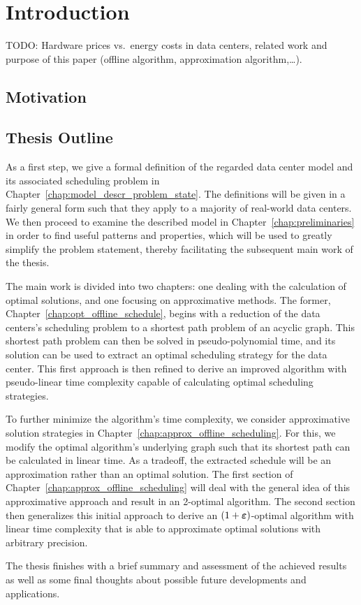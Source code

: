 
\chapter{Introduction}
TODO: Hardware prices vs.\ energy costs in data centers, related work and purpose of this paper (offline algorithm, approximation algorithm,\ldots).
\section{Motivation}

\section{Thesis Outline}
As a first step, we give a formal definition of the regarded data center model and its associated scheduling problem in Chapter~\ref{chap:model_descr_problem_state}. The definitions will be given in a fairly general form such that they apply to a majority of real-world data centers. We then proceed to examine the described model in Chapter~\ref{chap:preliminaries} in order to find useful patterns and properties, which will be used to greatly simplify the problem statement, thereby facilitating the subsequent main work of the thesis.

The main work is divided into two chapters: one dealing with the calculation of optimal solutions, and one focusing on approximative methods. The former, Chapter~\ref{chap:opt_offline_schedule}, begins with a reduction of the data centers's scheduling problem to a shortest path problem of an acyclic graph. This shortest path problem can then be solved in pseudo-polynomial time, and its solution can be used to extract an optimal scheduling strategy for the data center. This first approach is then refined to derive an improved algorithm with pseudo-linear time complexity capable of calculating optimal scheduling strategies. 

To further minimize the algorithm's time complexity, we consider approximative solution strategies in Chapter~\ref{chap:approx_offline_scheduling}. For this, we modify the optimal algorithm's underlying graph such that its shortest path can be calculated in linear time. As a tradeoff, the extracted schedule will be an approximation rather than an optimal solution. The first section of Chapter~\ref{chap:approx_offline_scheduling} will deal with the general idea of this approximative approach and result in an 2-optimal algorithm. The second section then generalizes this initial approach to derive an $(1+\boldsymbol\varepsilon)$-optimal algorithm with linear time complexity that is able to approximate optimal solutions with arbitrary precision.

The thesis finishes with a brief summary and assessment of the achieved results as well as some final thoughts about possible future developments and applications.
